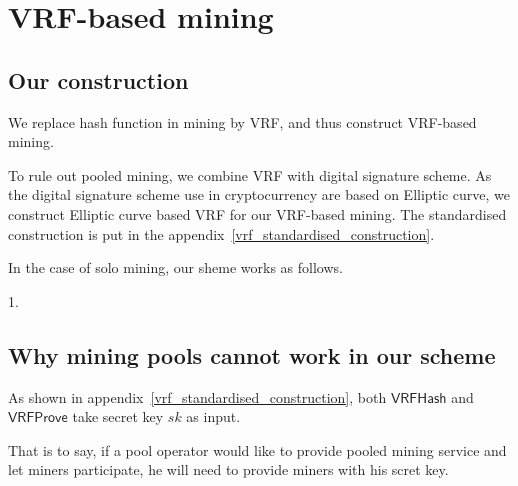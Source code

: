 \section{VRF-based mining}

\subsection{Our construction}

We replace hash function in mining by VRF, and thus construct VRF-based mining.

To rule out pooled mining, we combine VRF with digital signature scheme.
As the digital signature scheme use in cryptocurrency are based on Elliptic curve, we construct Elliptic curve based VRF for our VRF-based mining.
The standardised construction is put in the appendix~\ref{vrf_standardised_construction}.


In the case of solo mining, our sheme works as follows.

1. 


\subsection{Why mining pools cannot work in our scheme}

As shown in appendix~\ref{vrf_standardised_construction}, both $\mathsf{VRFHash}$ and $\mathsf{VRFProve}$ take secret key $sk$ as input.

That is to say, if a pool operator would like to provide pooled mining service and let miners participate, he will need to provide miners with his scret key.


